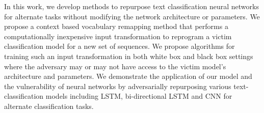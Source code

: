 In this work, we develop methods to repurpose text classification neural networks for alternate tasks without modifying the network architecture or parameters. We propose a context based vocabulary remapping method that performs a computationally inexpensive input transformation to reprogram a victim classification model for a new set of sequences. We propose algorithms for training such an input transformation in both white box and black box settings where the adversary may or may not have access to the victim model's architecture and parameters. We demonstrate the application of our model and the vulnerability of neural networks by adversarially repurposing various text-classification models including LSTM, bi-directional LSTM and CNN for alternate classification tasks.